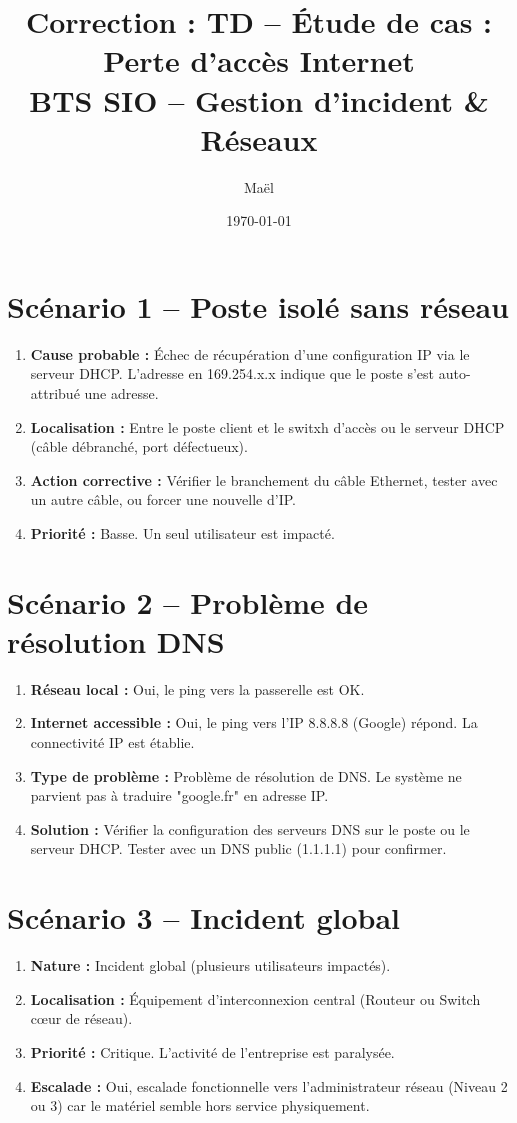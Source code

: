 \documentclass[12pt,a4paper]{article}
\title{\textbf{Correction : TD -- Étude de cas : Perte d’accès Internet}\\
\large BTS SIO -- Gestion d’incident \& Réseaux}
\author{Maël}
\date{\today}
\begin{document}
\maketitle

\section*{Scénario 1 -- Poste isolé sans réseau}
\begin{enumerate}
    \item \textbf{Cause probable :} Échec de récupération d'une configuration IP via le serveur DHCP. L'adresse en 169.254.x.x indique que le poste s'est auto-attribué une adresse.
    \item \textbf{Localisation :} Entre le poste client et le switxh d'accès ou le serveur DHCP (câble débranché, port défectueux).
    \item \textbf{Action corrective :} Vérifier le branchement du câble Ethernet, tester avec un autre câble, ou forcer une nouvelle d'IP.
    \item \textbf{Priorité :} Basse. Un seul utilisateur est impacté.
\end{enumerate}




\section*{Scénario 2 -- Problème de résolution DNS}
\begin{enumerate}
    \item \textbf{Réseau local :} Oui, le ping vers la passerelle est OK.
    \item \textbf{Internet accessible :} Oui, le ping vers l'IP 8.8.8.8 (Google) répond. La connectivité IP est établie.
    \item \textbf{Type de problème :} Problème de résolution de DNS. Le système ne parvient pas à traduire "google.fr" en adresse IP.
    \item \textbf{Solution :} Vérifier la configuration des serveurs DNS sur le poste ou le serveur DHCP. Tester avec un DNS public (1.1.1.1) pour confirmer.
\end{enumerate}




\section*{Scénario 3 -- Incident global}
\begin{enumerate}
    \item \textbf{Nature :} Incident global (plusieurs utilisateurs impactés).
    \item \textbf{Localisation :} Équipement d'interconnexion central (Routeur ou Switch cœur de réseau).
    \item \textbf{Priorité :} Critique. L'activité de l'entreprise est paralysée.
    \item \textbf{Escalade :} Oui, escalade fonctionnelle vers l'administrateur réseau (Niveau 2 ou 3) car le matériel semble hors service physiquement.
\end{enumerate}
\end{document}
